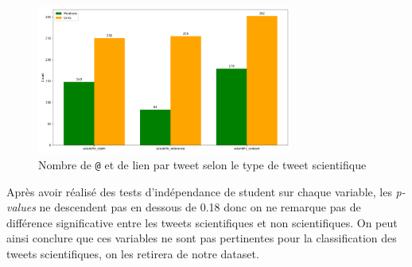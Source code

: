 \begin{figure}[H]
    \centering
    \includegraphics[width=0.75\textwidth]{images/hashtag_links_mentions_count_outliers}
    \caption{Nombre de \texttt{@} et de lien par tweet selon le type de tweet scientifique}
    \label{fig:hashtag_count}
\end{figure}

Après avoir réalisé des tests d'indépendance de student sur chaque variable, les \textit{p-values} ne descendent pas en dessous de 0.18 donc on ne remarque pas de différence significative entre les tweets scientifiques et non scientifiques.
On peut ainsi conclure que ces variables ne sont pas pertinentes pour la classification des tweets scientifiques, on les retirera de notre dataset.